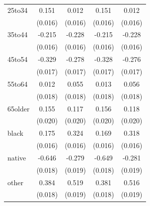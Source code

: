 \documentclass[11pt,a4paper,oldfontcommands]{memoir}
\begin{document}
{\begin{footnotesize}
\begin{footnotesize}
\begin{longtable}{l*{4}{c}}
25to34              &       0.151\sym{***}&       0.012         &       0.151\sym{***}&       0.012         \\
                    &     (0.016)         &     (0.016)         &     (0.016)         &     (0.016)         \\
 
35to44              &      -0.215\sym{***}&      -0.228\sym{***}&      -0.215\sym{***}&      -0.228\sym{***}\\
                    &     (0.016)         &     (0.016)         &     (0.016)         &     (0.016)         \\
 
45to54              &      -0.329\sym{***}&      -0.278\sym{***}&      -0.328\sym{***}&      -0.276\sym{***}\\
                    &     (0.017)         &     (0.017)         &     (0.017)         &     (0.017)         \\
 
55to64              &       0.012         &       0.055\sym{**} &       0.013         &       0.056\sym{**} \\
                    &     (0.018)         &     (0.018)         &     (0.018)         &     (0.018)         \\
 
65older             &       0.155\sym{***}&       0.117\sym{***}&       0.156\sym{***}&       0.118\sym{***}\\
                    &     (0.020)         &     (0.020)         &     (0.020)         &     (0.020)         \\
 
black               &       0.175\sym{***}&       0.324\sym{***}&       0.169\sym{***}&       0.318\sym{***}\\
                    &     (0.016)         &     (0.016)         &     (0.016)         &     (0.016)         \\
 
native              &      -0.646\sym{***}&      -0.279\sym{***}&      -0.649\sym{***}&      -0.281\sym{***}\\
                    &     (0.018)         &     (0.019)         &     (0.018)         &     (0.019)         \\
 
other               &       0.384\sym{***}&       0.519\sym{***}&       0.381\sym{***}&       0.516\sym{***}\\
                    &     (0.018)         &     (0.019)         &     (0.018)         &     (0.019)         \\
 

\end{longtable}
\end{footnotesize}
\end{footnotesize}}
\end{document}
